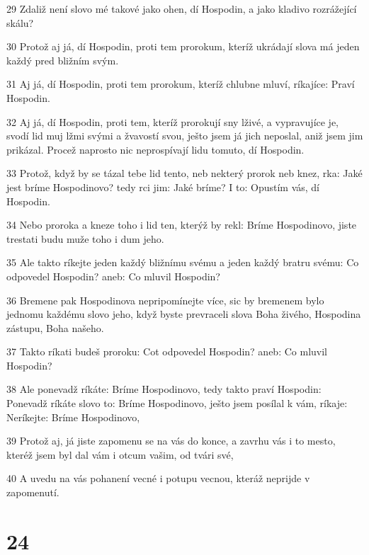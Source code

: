 \par 29 Zdaliž není slovo mé takové jako ohen, dí Hospodin, a jako kladivo rozrážející skálu?
\par 30 Protož aj já, dí Hospodin, proti tem prorokum, kteríž ukrádají slova má jeden každý pred bližním svým.
\par 31 Aj já, dí Hospodin, proti tem prorokum, kteríž chlubne mluví, ríkajíce: Praví Hospodin.
\par 32 Aj já, dí Hospodin, proti tem, kteríž prorokují sny lživé, a vypravujíce je, svodí lid muj lžmi svými a žvavostí svou, ješto jsem já jich neposlal, aniž jsem jim prikázal. Procež naprosto nic neprospívají lidu tomuto, dí Hospodin.
\par 33 Protož, když by se tázal tebe lid tento, neb nekterý prorok neb knez, rka: Jaké jest bríme Hospodinovo? tedy rci jim: Jaké bríme? I to: Opustím vás, dí Hospodin.
\par 34 Nebo proroka a kneze toho i lid ten, kterýž by rekl: Bríme Hospodinovo, jiste trestati budu muže toho i dum jeho.
\par 35 Ale takto ríkejte jeden každý bližnímu svému a jeden každý bratru svému: Co odpovedel Hospodin? aneb: Co mluvil Hospodin?
\par 36 Bremene pak Hospodinova nepripomínejte více, sic by bremenem bylo jednomu každému slovo jeho, když byste prevraceli slova Boha živého, Hospodina zástupu, Boha našeho.
\par 37 Takto ríkati budeš proroku: Cot odpovedel Hospodin? aneb: Co mluvil Hospodin?
\par 38 Ale ponevadž ríkáte: Bríme Hospodinovo, tedy takto praví Hospodin: Ponevadž ríkáte slovo to: Bríme Hospodinovo, ješto jsem posílal k vám, ríkaje: Neríkejte: Bríme Hospodinovo,
\par 39 Protož aj, já jiste zapomenu se na vás do konce, a zavrhu vás i to mesto, kteréž jsem byl dal vám i otcum vašim, od tvári své,
\par 40 A uvedu na vás pohanení vecné i potupu vecnou, kteráž neprijde v zapomenutí.

\chapter{24}


